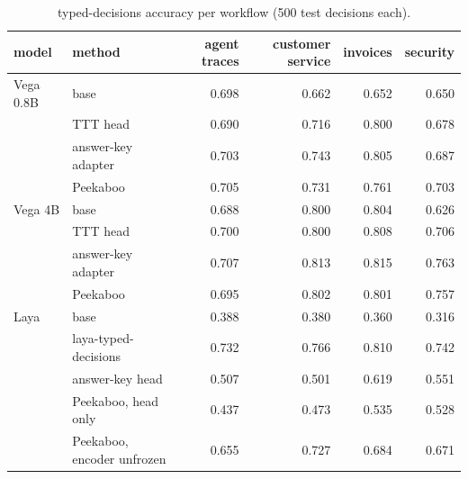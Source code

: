 \begin{table}[tbp]\centering\small
\caption{typed-decisions accuracy per workflow (500 test decisions each).}
\label{tab:wf}
\setlength{\tabcolsep}{3pt}
\begin{tabular}{llrrrr}
\toprule
model & method & agent traces & customer service & invoices & security \\
\midrule
Vega 0.8B & base & 0.698 & 0.662 & 0.652 & 0.650 \\
 & TTT head & 0.690 & 0.716 & 0.800 & 0.678 \\
 & answer-key adapter & 0.703 & 0.743 & 0.805 & 0.687 \\
 & Peekaboo & 0.705 & 0.731 & 0.761 & 0.703 \\
\addlinespace
Vega 4B & base & 0.688 & 0.800 & 0.804 & 0.626 \\
 & TTT head & 0.700 & 0.800 & 0.808 & 0.706 \\
 & answer-key adapter & 0.707 & 0.813 & 0.815 & 0.763 \\
 & Peekaboo & 0.695 & 0.802 & 0.801 & 0.757 \\
\addlinespace
Laya & base & 0.388 & 0.380 & 0.360 & 0.316 \\
 & laya-typed-decisions & 0.732 & 0.766 & 0.810 & 0.742 \\
 & answer-key head & 0.507 & 0.501 & 0.619 & 0.551 \\
 & Peekaboo, head only & 0.437 & 0.473 & 0.535 & 0.528 \\
 & Peekaboo, encoder unfrozen & 0.655 & 0.727 & 0.684 & 0.671 \\
\bottomrule
\end{tabular}
\end{table}

